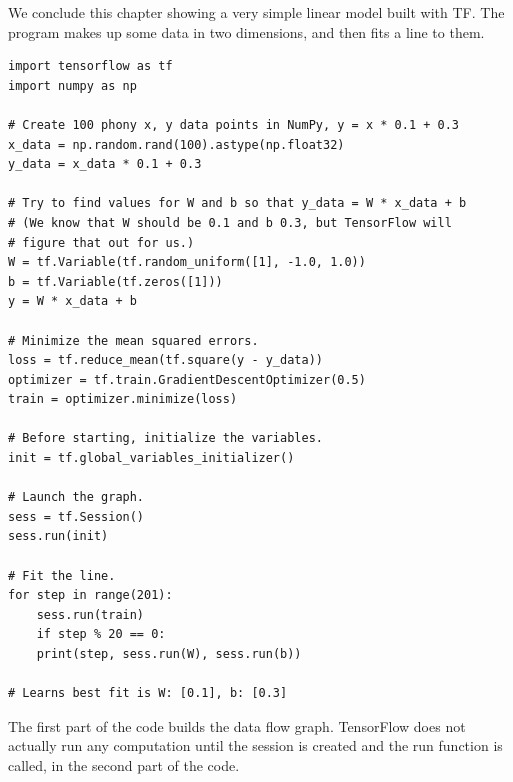 We conclude this chapter showing a very simple linear model built with \acs{TF}.  The program makes up some data in two dimensions, and then fits a line to them.

\begin{lstlisting}
import tensorflow as tf
import numpy as np

# Create 100 phony x, y data points in NumPy, y = x * 0.1 + 0.3
x_data = np.random.rand(100).astype(np.float32)
y_data = x_data * 0.1 + 0.3

# Try to find values for W and b so that y_data = W * x_data + b
# (We know that W should be 0.1 and b 0.3, but TensorFlow will
# figure that out for us.)
W = tf.Variable(tf.random_uniform([1], -1.0, 1.0))
b = tf.Variable(tf.zeros([1]))
y = W * x_data + b

# Minimize the mean squared errors.
loss = tf.reduce_mean(tf.square(y - y_data))
optimizer = tf.train.GradientDescentOptimizer(0.5)
train = optimizer.minimize(loss)

# Before starting, initialize the variables.
init = tf.global_variables_initializer()

# Launch the graph.
sess = tf.Session()
sess.run(init)

# Fit the line.
for step in range(201):
    sess.run(train)
    if step % 20 == 0:
    print(step, sess.run(W), sess.run(b))

# Learns best fit is W: [0.1], b: [0.3]
\end{lstlisting}

The first part of the code builds the data flow graph. TensorFlow does not actually run any computation until the session is created and the run function is called, in the second part of the code.